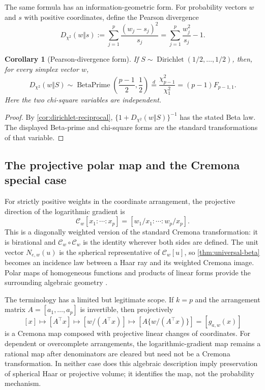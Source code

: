 \documentclass[11pt]{article}
\numberwithin{equation}{section}
\theoremstyle{thmstyleone}%
\newtheorem{corollary}[corollary]{Corollary}
\theoremstyle{thmstyletwo}%
\let\cref\autoref
\newcommand{\BetaPrime}{\operatorname{BetaPrime}}
\newcommand{\Dir}{\operatorname{Dirichlet}}
\begin{document}
The same formula has an information-geometric form.  For probability vectors
\(w\) and \(s\) with positive coordinates, define the Pearson divergence
\[
  D_{\chi^2}(w\Vert s)
  :=\sum_{j=1}^p\frac{(w_j-s_j)^2}{s_j}
  =\sum_{j=1}^p\frac{w_j^2}{s_j}-1.
\]

\begin{corollary}[Pearson-divergence form]
\label{cor:pearson-divergence}
If
\(S\sim\Dir(1/2,\ldots,1/2)\), then, for every simplex vector \(w\),
\[
  D_{\chi^2}(w\Vert S)
  \sim
  \BetaPrime\!\left(\frac{p-1}{2},\frac12\right)
  \overset d=
  \frac{\chi_{p-1}^2}{\chi_1^2}
  =(p-1)F_{p-1,1}.
\]
Here the two chi-square variables are independent.
\end{corollary}

\begin{proof}
By \cref{cor:dirichlet-reciprocal},
\(\{1+D_{\chi^2}(w\Vert S)\}^{-1}\) has the stated Beta law.  The displayed
Beta-prime and chi-square forms are the standard transformations of that
variable.
\end{proof}

\subsection{The projective polar map and the Cremona special case}

For strictly positive weights in the coordinate arrangement, the projective
direction of the logarithmic gradient is
\begin{equation}
  \mathcal C_w[x_1:\cdots:x_p]
  = [w_1/x_1:\cdots:w_p/x_p].
  \label{eq:weighted-cremona}
\end{equation}
This is a diagonally weighted version of the standard Cremona transformation:
it is birational and \(\mathcal C_w\circ\mathcal C_w\) is the identity
wherever both sides are defined.  The unit vector \(N_{e,w}(u)\) is the spherical representative
of \(\mathcal C_w[u]\), so \cref{thm:universal-beta} becomes an incidence law
between a Haar ray and its weighted Cremona image.  Polar maps of homogeneous
functions and products of linear forms provide the surrounding algebraic
geometry \cite{dolgachev-2000,cohen-denham-falk-varchenko-2012}.

The terminology has a limited but legitimate scope.  If \(k=p\) and the
arrangement matrix \(A=[a_1,\ldots,a_p]\) is invertible, then projectively
\[
  [x]
  \longmapsto
  [A^\top x]
  \longmapsto
  [w/(A^\top x)]
  \longmapsto
  [A\{w/(A^\top x)\}]
  =[g_{a,w}(x)]
\]
is a Cremona map composed with projective linear changes of coordinates.  For
dependent or overcomplete arrangements, the logarithmic-gradient map remains
a rational map after denominators are cleared but need not be a Cremona
transformation.  In neither case does this algebraic description imply
preservation of spherical Haar or
projective volume; it identifies the map, not the probability mechanism.
\end{document}
